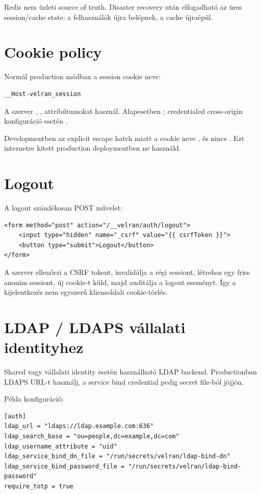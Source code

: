 Redis nem üzleti source of truth. Disaster recovery után elfogadható az üres session/cache state: a felhasználók újra belépnek, a cache újraépül.

\section{Cookie policy}

Normál production módban a session cookie neve:

\begin{lstlisting}
__Host-velran_session
\end{lstlisting}

A szerver , ,  attribútumokat használ. Alapesetben ; credentialed cross-origin konfiguráció esetén .

Developmentben az explicit  escape hatch miatt a cookie neve , és nincs . Ezt internetre kitett production deploymentben ne használd.

\section{Logout}

A logout szándékosan POST művelet:

\begin{lstlisting}[language=Velran]
<form method="post" action="/__velran/auth/logout">
    <input type="hidden" name="_csrf" value="{{ csrfToken }}">
    <button type="submit">Logout</button>
</form>
\end{lstlisting}

A szerver ellenőrzi a CSRF tokent, invalidálja a régi sessiont, létrehoz egy friss anonim sessiont, új cookie-t küld, majd auditálja a logout eseményt. Így a kijelentkezés nem egyszerű kliensoldali cookie-törlés.

\section{LDAP / LDAPS vállalati identityhez}

Shared vagy vállalati identity esetén használható LDAP backend. Productionban LDAPS URL-t használj, a service bind credential pedig secret file-ból jöjjön.

Példa konfiguráció:

\begin{lstlisting}
[auth]
ldap_url = "ldaps://ldap.example.com:636"
ldap_search_base = "ou=people,dc=example,dc=com"
ldap_username_attribute = "uid"
ldap_service_bind_dn_file = "/run/secrets/velran/ldap-bind-dn"
ldap_service_bind_password_file = "/run/secrets/velran/ldap-bind-password"
require_totp = true
\end{lstlisting}


